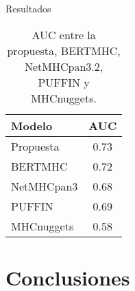 \documentclass[10pt]{beamer}
\newcommand{\1}{
	\setbeamertemplate{background}{
		\texttt{[image: ../img/1]}
		\tikz[overlay] \fill[fill opacity=0.75,fill=white] (0,0) rectangle (-\paperwidth,\paperheight);
	}
}
\begin{document}
	\begin{frame}{Resultados}{}
		\begin{table}[h]
			\centering
			\caption{AUC entre la propuesta, BERTMHC, NetMHCpan3.2, PUFFIN y MHCnuggets.}
			\setlength{\tabcolsep}{0.8em} %
			{\renewcommand{\arraystretch}{1.3}%
				\begin{tabular}{lc}
					\hline
					\textbf{Modelo} & \textbf{AUC} \\ \hline
					Propuesta & 0.73\\
					BERTMHC & 0.72\\
					NetMHCpan3 & 0.68\\
					PUFFIN & 0.69\\
					MHCnuggets & 0.58\\
				\end{tabular}
			}
		\end{table}
	\end{frame}
	
	
	\section{Conclusiones}
	
\end{document}
